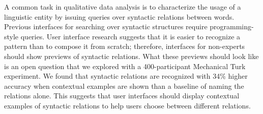 A common task in qualitative data analysis is to characterize the usage of a linguistic entity by issuing queries over syntactic relations between words. Previous interfaces for  searching over syntactic structures require programming-style queries. User interface research suggests that it is easier to recognize a pattern than to compose it from scratch; therefore, interfaces for non-experts should show previews of syntactic relations. What these previews should look like is an open question that we explored with a 400-participant Mechanical Turk experiment. We found that syntactic relations are recognized with 34\% higher accuracy when contextual examples are shown than a baseline of naming the relations alone.  This suggests that user interfaces should display contextual examples of syntactic relations to help users choose between different relations.
